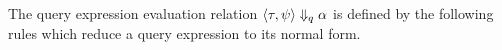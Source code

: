 The query expression evaluation relation  $\langle \mathtt{\tau}, \psi \rangle \Downarrow_q \alpha$ is defined by the following rules which reduce a query expression to its normal form.
{\small
{}
 }
